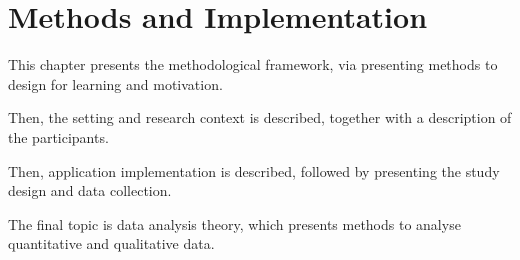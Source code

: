 \chapter{Methods and Implementation}\label{cha:Method}





This chapter presents the methodological framework, via presenting methods to design for learning and motivation.

Then, the setting and research context is described, together with a description of the participants.

Then, application implementation is described, followed by presenting the study design and data collection.

The final topic is data analysis theory, which presents methods to analyse quantitative and qualitative data.














